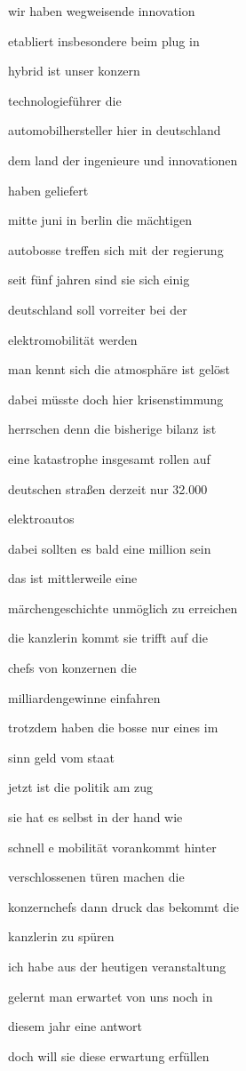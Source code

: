 \documentclass[a4paper, 11pt]{book} %
\begin{document}
wir haben wegweisende innovation

etabliert insbesondere beim plug in

hybrid ist unser konzern

technologieführer die

automobilhersteller hier in deutschland

dem land der ingenieure und innovationen

haben geliefert

mitte juni in berlin die mächtigen

autobosse treffen sich mit der regierung

seit fünf jahren sind sie sich einig

deutschland soll vorreiter bei der

elektromobilität werden

man kennt sich die atmosphäre ist gelöst

dabei müsste doch hier krisenstimmung

herrschen denn die bisherige bilanz ist

eine katastrophe insgesamt rollen auf

deutschen straßen derzeit nur 32.000

elektroautos

dabei sollten es bald eine million sein

das ist mittlerweile eine

märchengeschichte unmöglich zu erreichen

die kanzlerin kommt sie trifft auf die

chefs von konzernen die

milliardengewinne einfahren

trotzdem haben die bosse nur eines im

sinn geld vom staat

jetzt ist die politik am zug

sie hat es selbst in der hand wie

schnell e mobilität vorankommt hinter

verschlossenen türen machen die

konzernchefs dann druck das bekommt die

kanzlerin zu spüren

ich habe aus der heutigen veranstaltung

gelernt man erwartet von uns noch in

diesem jahr eine antwort

doch will sie diese erwartung erfüllen
\end{document}
